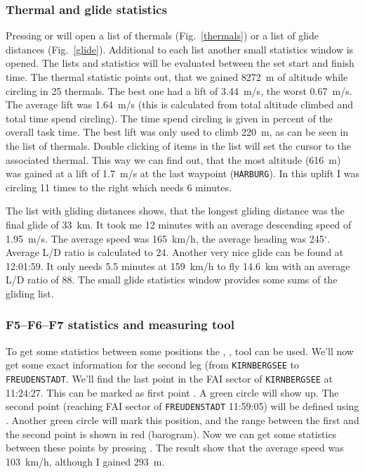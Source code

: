 \subsubsection{Thermal and glide statistics}
Pressing  or  will open a list of thermals (Fig.~\ref{thermals}) or a list of glide distances (Fig.~\ref{glide}).
Additional to each list another small statistics window is opened. The lists and statistics will be evaluated between the set start and finish time.
The thermal statistic points out, that we gained 8272~m of altitude while circling in 25 thermals. The best one had a lift of 3.44~m/s, the worst 0.67~m/s.
The average lift was 1.64~m/s (this is calculated from total altitude climbed and total time spend circling).
The time spend circling is given in percent of the overall task time. The best lift was only used to climb 220~m, as can be seen in the list of thermals.
Double clicking of items in the list will set the cursor to the associated thermal.
This way we can find out, that the most altitude (616~m) was gained at a lift of 1.7~m/s at the last waypoint (\texttt{HARBURG}).
In this uplift I was circling 11 times to the right which needs 6 minutes.

The list with gliding distances shows, that the longest gliding distance was the final glide of 33~km.
It took me 12 minutes with an average descending speed of 1.95~m/s. The average speed was 165~km/h, the average heading was 245$^\circ$.
Average L/D ratio is calculated to 24. Another very nice glide can be found at 12:01:59.
It only needs 5.5 minutes at 159~km/h to fly 14.6~km with an average L/D ratio of 88.
The small glide statistics window provides some sums of the gliding list.


\subsubsection{F5--F6--F7 statistics and measuring tool}
\label{f5f6f7}
To get some statistics between some positions the , ,  tool can be used.
We'll now get some exact information for the second leg (from \texttt{KIRNBERGSEE} to \texttt{FREUDENSTADT}.
We'll find the last point in the FAI sector of \texttt{KIRNBERGSEE} at 11:24:27. This can be marked as first point .
A green circle will show up. The second point (reaching FAI sector of \texttt{FREUDENSTADT} 11:59:05) will be defined using .
Another green circle will mark this position, and the range between the first and the second point is shown in red (barogram).
Now we can get some statistics between these points by pressing .
The result show that the average speed was 103~km/h, although I gained 293~m.


